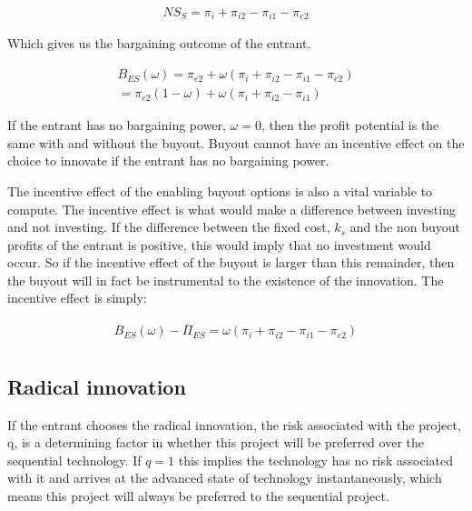 \documentclass[11pt]{article}
\begin{document}
\begin{align*}
NS_S= %
\pi_{i} +  \pi_{i2} - \pi_{i1}  -  \pi_{e2}
\end{align*}

Which gives us the bargaining outcome of the entrant.  

\begin{align*}
B_{ES}(\omega) = 
 \pi_{e2}+ \omega ( \pi_{i} +  \pi_{i2} - \pi_{i1}  -  \pi_{e2}) \\
= \pi_{e2}(1-\omega)+ \omega (\pi_{i} +  \pi_{i2} - \pi_{i1} )
\end{align*}

If the entrant has no bargaining power, $\omega=0$, then the profit potential is the same with and without the buyout. Buyout cannot have an incentive effect on the choice to innovate if the entrant has no bargaining power. 

The incentive effect of the enabling buyout options is also a vital variable to compute. The incentive effect is what would make a difference between investing and not investing. If the difference between the fixed cost, $k_s$ and the non buyout profits of the entrant is positive, this would imply that no investment would occur. So if the incentive effect of the buyout is larger than this remainder, then the buyout will in fact be instrumental to the existence of the innovation. The incentive effect is simply: 

\begin{align*}
B_{ES}(\omega) - \overline{\Pi}_{ES} = 
\omega (\pi_{i} +  \pi_{i2} - \pi_{i1}-\pi_{e2} ) \\
\end{align*}

\subsection*{Radical innovation}

If the entrant chooses the radical innovation, the risk associated with the project, q, is a determining factor in whether this project will be preferred over the sequential technology. If $q=1$ this implies the technology has no risk associated with it and arrives at the advanced state of technology instantaneously, which means this project will always be preferred to the sequential project. 
\end{document}
